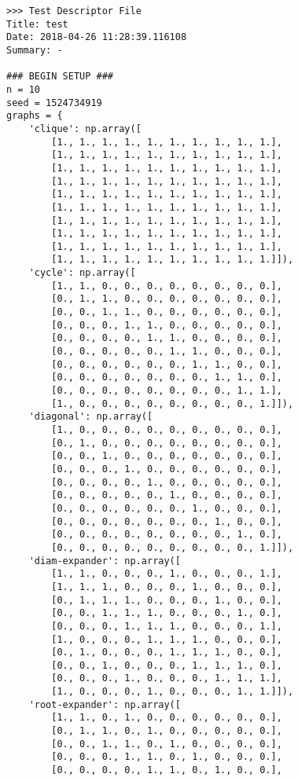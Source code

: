 \documentclass[11pt]{article}
\begin{document}
\begin{verbatim}
>>> Test Descriptor File
Title: test
Date: 2018-04-26 11:28:39.116108
Summary: -

### BEGIN SETUP ###
n = 10
seed = 1524734919
graphs = {
    'clique': np.array([
        [1., 1., 1., 1., 1., 1., 1., 1., 1., 1.],
        [1., 1., 1., 1., 1., 1., 1., 1., 1., 1.],
        [1., 1., 1., 1., 1., 1., 1., 1., 1., 1.],
        [1., 1., 1., 1., 1., 1., 1., 1., 1., 1.],
        [1., 1., 1., 1., 1., 1., 1., 1., 1., 1.],
        [1., 1., 1., 1., 1., 1., 1., 1., 1., 1.],
        [1., 1., 1., 1., 1., 1., 1., 1., 1., 1.],
        [1., 1., 1., 1., 1., 1., 1., 1., 1., 1.],
        [1., 1., 1., 1., 1., 1., 1., 1., 1., 1.],
        [1., 1., 1., 1., 1., 1., 1., 1., 1., 1.]]),
    'cycle': np.array([
        [1., 1., 0., 0., 0., 0., 0., 0., 0., 0.],
        [0., 1., 1., 0., 0., 0., 0., 0., 0., 0.],
        [0., 0., 1., 1., 0., 0., 0., 0., 0., 0.],
        [0., 0., 0., 1., 1., 0., 0., 0., 0., 0.],
        [0., 0., 0., 0., 1., 1., 0., 0., 0., 0.],
        [0., 0., 0., 0., 0., 1., 1., 0., 0., 0.],
        [0., 0., 0., 0., 0., 0., 1., 1., 0., 0.],
        [0., 0., 0., 0., 0., 0., 0., 1., 1., 0.],
        [0., 0., 0., 0., 0., 0., 0., 0., 1., 1.],
        [1., 0., 0., 0., 0., 0., 0., 0., 0., 1.]]),
    'diagonal': np.array([
        [1., 0., 0., 0., 0., 0., 0., 0., 0., 0.],
        [0., 1., 0., 0., 0., 0., 0., 0., 0., 0.],
        [0., 0., 1., 0., 0., 0., 0., 0., 0., 0.],
        [0., 0., 0., 1., 0., 0., 0., 0., 0., 0.],
        [0., 0., 0., 0., 1., 0., 0., 0., 0., 0.],
        [0., 0., 0., 0., 0., 1., 0., 0., 0., 0.],
        [0., 0., 0., 0., 0., 0., 1., 0., 0., 0.],
        [0., 0., 0., 0., 0., 0., 0., 1., 0., 0.],
        [0., 0., 0., 0., 0., 0., 0., 0., 1., 0.],
        [0., 0., 0., 0., 0., 0., 0., 0., 0., 1.]]),
    'diam-expander': np.array([
        [1., 1., 0., 0., 0., 1., 0., 0., 0., 1.],
        [1., 1., 1., 0., 0., 0., 1., 0., 0., 0.],
        [0., 1., 1., 1., 0., 0., 0., 1., 0., 0.],
        [0., 0., 1., 1., 1., 0., 0., 0., 1., 0.],
        [0., 0., 0., 1., 1., 1., 0., 0., 0., 1.],
        [1., 0., 0., 0., 1., 1., 1., 0., 0., 0.],
        [0., 1., 0., 0., 0., 1., 1., 1., 0., 0.],
        [0., 0., 1., 0., 0., 0., 1., 1., 1., 0.],
        [0., 0., 0., 1., 0., 0., 0., 1., 1., 1.],
        [1., 0., 0., 0., 1., 0., 0., 0., 1., 1.]]),
    'root-expander': np.array([
        [1., 1., 0., 1., 0., 0., 0., 0., 0., 0.],
        [0., 1., 1., 0., 1., 0., 0., 0., 0., 0.],
        [0., 0., 1., 1., 0., 1., 0., 0., 0., 0.],
        [0., 0., 0., 1., 1., 0., 1., 0., 0., 0.],
        [0., 0., 0., 0., 1., 1., 0., 1., 0., 0.],

\end{verbatim}
\end{document}
